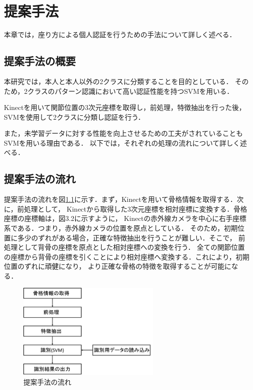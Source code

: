 \chapter{提案手法}\label{abst}
本章では，座り方による個人認証を行うための手法について詳しく述べる．

\section{提案手法の概要}
本研究では，本人と本人以外の2クラスに分類することを目的としている．
そのため，2クラスのパターン認識において高い認証性能を持つSVMを用いる．

Kinectを用いて関節位置の3次元座標を取得し，前処理，特徴抽出を行った後，SVMを使用して2クラスに分類し認証を行う．

また，未学習データに対する性能を向上させるための工夫がされていることもSVMを用いる理由である．
以下では，それぞれの処理の流れについて詳しく述べる．

\section{提案手法の流れ}
提案手法の流れを図\ref{fig:syuho}に示す．まず，Kinectを用いて骨格情報を取得する．次に，前処理として，
Kinectから取得した3次元座標を相対座標に変換する．骨格座標の座標軸は，図3.2に示すように，
Kinectの赤外線カメラを中心に右手座標系である．つまり，赤外線カメラの位置を原点としている．
そのため，初期位置に多少のずれがある場合，正確な特徴抽出を行うことが難しい．そこで，
前処理として背骨の座標を原点とした相対座標への変換を行う．
全ての関節位置の座標から背骨の座標を引くことにより相対座標へ変換する．これにより，初期位置のずれに頑健になり，
より正確な骨格の特徴を取得することが可能になる．

\newpage

\begin{figure}[htbp]
  \begin{center}
    \includegraphics[clip,width=7.0cm]{./images/nagare.png}
    \caption{提案手法の流れ}
    \label{fig:syuho}
  \end{center}
\end{figure}

